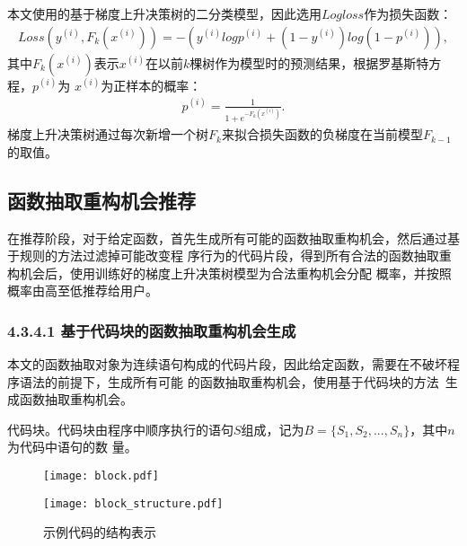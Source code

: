 本文使用的基于梯度上升决策树的二分类模型，因此选用$Logloss$作为损失函数：
\begin{eqnarray}
  Loss(y^{(i)},F_k(x^{(i)})) = -(y^{(i)}logp^{(i)} + (1-y^{(i)})log(1-p^{(i)})),
\end{eqnarray}\label{logloss}
其中$F_k(x^{(i)})$表示$x^{(i)}$在以前$k$棵树作为模型时的预测结果，根据罗基斯特方程，$p^{(i)}$为
$x^{(i)}$为正样本的概率：
\begin{eqnarray}
  p^{(i)} = \frac{1}{1 + e^{-F_k(x^{(i)})}}.
\end{eqnarray}
梯度上升决策树通过每次新增一个树$F_k$来拟合损失函数的负梯度在当前模型$F_{k-1}$的取值。

\subsection{函数抽取重构机会推荐}
在推荐阶段，对于给定函数，首先生成所有可能的函数抽取重构机会，然后通过基于规则的方法过滤掉可能改变程
序行为的代码片段，得到所有合法的函数抽取重构机会后，使用训练好的梯度上升决策树模型为合法重构机会分配
概率，并按照概率由高至低推荐给用户。

\subsubsection{4.3.4.1 基于代码块的函数抽取重构机会生成}
本文的函数抽取对象为连续语句构成的代码片段，因此给定函数，需要在不破坏程序语法的前提下，生成所有可能
的函数抽取重构机会，使用基于代码块的方法~\cite{silva:ICPC14}生成函数抽取重构机会。
\begin{Definition}\label{block}
  代码块。代码块由程序中顺序执行的语句$S$组成，记为$B=\{S_1,S_2,...,S_n\}$，其中$n$为代码中语句的数
  量。
\end{Definition}

\begin{figure} 
  \centering 
  \begin{minipage}[c]{0.5\textwidth} 
    \centering 
    \texttt{[image: block.pdf]} 
  \end{minipage}%
  \begin{minipage}[c]{0.5\textwidth} 
    \centering 
    \texttt{[image: block\_structure.pdf]} 
  \end{minipage} 
\caption{示例代码的结构表示}
\label{block-example}
\end{figure}


